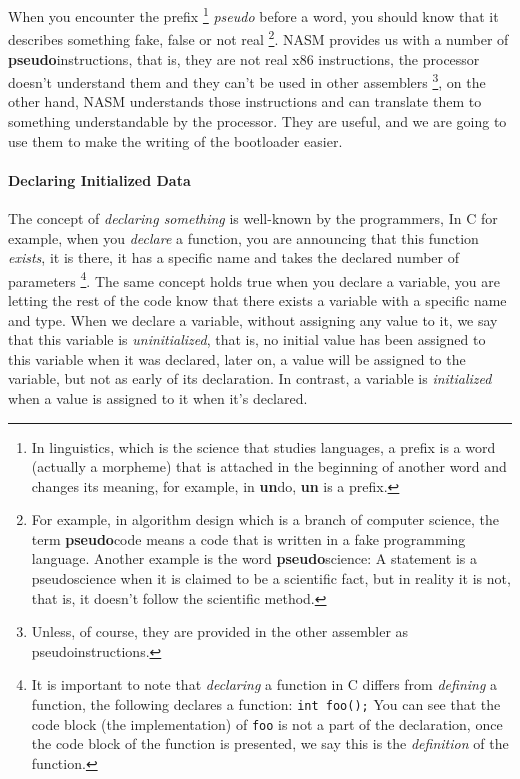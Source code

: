 When you encounter the prefix \footnote{In linguistics, which is the
  science that studies languages, a prefix is a word (actually a
  morpheme) that is attached in the beginning of another word and
  changes its meaning, for example, in \textbf{un}do, \textbf{un} is a
  prefix.} \emph{pseudo} before a word, you should know that it
describes something fake, false or not real \footnote{For example, in
  algorithm design which is a branch of computer science, the term
  \textbf{pseudo}code means a code that is written in a fake programming
  language. Another example is the word \textbf{pseudo}science: A
  statement is a pseudoscience when it is claimed to be a scientific
  fact, but in reality it is not, that is, it doesn't follow the
  scientific method.}. NASM provides us with a number of
\textbf{pseudo}instructions, that is, they are not real x86
instructions, the processor doesn't understand them and they can't be
used in other assemblers \footnote{Unless, of course, they are provided
  in the other assembler as pseudoinstructions.}, on the other hand,
NASM understands those instructions and can translate them to something
understandable by the processor. They are useful, and we are going to
use them to make the writing of the bootloader easier.

\paragraph{Declaring Initialized Data}\label{declaring-initialized-data}

The concept of \emph{declaring something} is well-known by the
programmers, In C for example, when you \emph{declare} a function, you
are announcing that this function \emph{exists}, it is there, it has a
specific name and takes the declared number of parameters \footnote{It
  is important to note that \emph{declaring} a function in C differs
  from \emph{defining} a function, the following declares a function:
  \lstinline!int foo();! You can see that the code block (the
  implementation) of \lstinline!foo! is not a part of the declaration,
  once the code block of the function is presented, we say this is the
  \emph{definition} of the function.}. The same concept holds true when
you declare a variable, you are letting the rest of the code know that
there exists a variable with a specific name and type. When we declare a
variable, without assigning any value to it, we say that this variable
is \emph{uninitialized}, that is, no initial value has been assigned to
this variable when it was declared, later on, a value will be assigned
to the variable, but not as early of its declaration. In contrast, a
variable is \emph{initialized} when a value is assigned to it when it's
declared.

